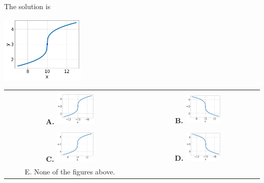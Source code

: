 \documentclass{article}[14pt]
\begin{document}
 
 The solution is  
 \begin{center} \includegraphics[width=0.3\textwidth]{../Figures/radicalEquationToGraphBC.png} \end{center}\begin{tabular}{|c|c|} 
\hline 
 & \tabularnewline 
 \textbf{A.} \includegraphics[width=0.3\textwidth]{../Figures/radicalEquationToGraphBA.png} & \textbf{B.} \includegraphics[width=0.3\textwidth]{../Figures/radicalEquationToGraphBB.png} \tabularnewline 
\hline 
 & \tabularnewline 
 \textbf{C.} \includegraphics[width=0.3\textwidth]{../Figures/radicalEquationToGraphBC.png} & \textbf{D.} \includegraphics[width=0.3\textwidth]{../Figures/radicalEquationToGraphBD.png} \tabularnewline 
\hline 
 E. None of the figures above. & \tabularnewline 
\hline 
 \end{tabular} 
 
\end{document}
